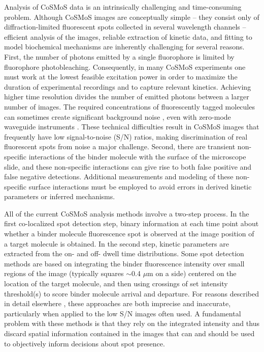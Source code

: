 Analysis of CoSMoS data is an intrinsically challenging and time-consuming problem. Although CoSMoS images are conceptually simple -- they consist only of diffraction-limited fluorescent spots collected in several wavelength channels -- efficient analysis of the images, reliable extraction of kinetic data, and fitting to model biochemical mechanisms are inherently challenging for several reasons. First, the number of photons emitted by a single fluorophore is limited by fluorophore photobleaching. Consequently, in many CoSMoS experiments one must work at the lowest feasible excitation power in order to maximize the duration of experimental recordings and to capture relevant kinetics. Achieving higher time resolution divides the number of emitted photons between a larger number of images. The required concentrations of fluorescently tagged molecules can sometimes create significant background noise \citep{Peng2018-ge, Van_Oijen2011-ig}, even with zero-mode waveguide instruments \citep{Chen2014-jd}. These technical difficulties result in CoSMoS images that frequently have low signal-to-noise (S/N) ratios, making discrimination of real fluorescent spots from noise a major challenge. Second, there are transient non-specific interactions of the binder molecule with the surface of the microscope slide, and these non-specific interactions can give rise to both false positive and false negative detections. Additional measurements and modeling of these non-specific surface interactions must be employed to avoid errors in derived kinetic parameters or inferred mechanisms.

All of the current CoSMoS analysis methods involve a two-step process. In the first co-localized spot detection step, binary information at each time point about whether a binder molecule fluorescence spot is observed at the image position of a target molecule is obtained. In the second step, kinetic parameters are extracted from the on- and off- dwell time distributions. Some spot detection methods are based on integrating the binder fluorescence intensity over small regions of the image (typically squares $\sim$0.4 $\mu$m on a side) centered on the location of the target molecule, and then using crossings of set intensity threshold(s) to score binder molecule arrival and departure. For reasons described in detail elsewhere \citep{Friedman2015-nx}, these approaches are both imprecise and inaccurate, particularly when applied to the low S/N images often used. A fundamental problem with these methods is that they rely on the integrated intensity and thus discard spatial information contained in the images that can and should be used to objectively inform decisions about spot presence.

